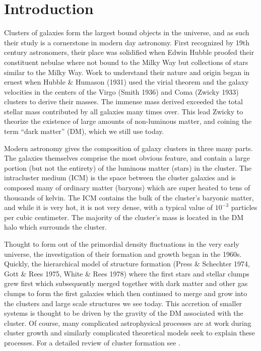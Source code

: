 \section{Introduction}\label{sec:introduction}
Clusters of galaxies form the largest bound objects in the universe, and as such their study is a cornerstone in modern day astronomy. First recognized by 19th century astronomers, their place was solidified when Edwin Hubble proofed their constituent nebulae where not bound to the Milky Way \citep{Hubble1926} but collections of stars similar to the Milky Way. Work to understand their nature and origin began in ernest when Hubble \& Humason (1931) used the virial theorem and the galaxy velocities in the centers of the Virgo (Smith 1936) and Coma (Zwicky 1933) clusters to derive their masses. The immense mass derived exceeded the total stellar mass contributed by all galaxies many times over. This lead Zwicky to theorize the existence of large amounts of non-luminous matter, and coining the term ``dark matter'' (DM), which we still use today.  

Modern astronomy gives the composition of galaxy clusters in three many parts. The galaxies themselves comprise the most obvious feature, and contain a large portion (but not the entirety) of the luminous matter (stars) in the cluster. The intracluster medium (ICM) is the space between the cluster galaxies and is composed many of ordinary matter (baryons) which are super heated to tens of thousands of kelvin. The ICM contains the bulk of the cluster's baryonic matter, and while it is very hot, it is not very dense, with a typical value of $10^{-3}$ particles per cubic centimeter. The majority of the cluster's mass is located in the DM halo which surrounds the cluster. 

Thought to form out of the primordial density fluctuations in the very early universe, the investigation of their formation and growth began in the 1960s. Quickly, the hierarchical model of structure formation (Press \& Schechter 1974, Gott \& Rees 1975, White \& Rees 1978) where the first stars and stellar clumps grew first which subsequently merged together with dark matter and other gas clumps to form the first galaxies which then continued to merge and grow into the clusters and large scale structures we see today. This accretion of smaller systems is thought to be driven by the gravity of the DM associated with the cluster. Of course, many complicated astrophysical processes are at work during cluster growth and similarly complicated theoretical models seek to explain these processes. For a detailed review of cluster formation see \cite{Kravtsov2012}.

